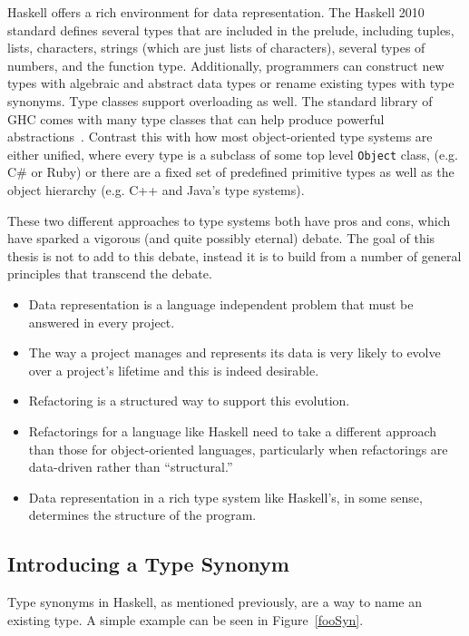 Haskell offers a rich environment for data representation. The Haskell 2010 standard defines several types that are included in the prelude, including tuples, lists, characters, strings (which are just lists of characters), several types of numbers, and the function type. Additionally, programmers can construct new types with algebraic and abstract data types or rename existing types with type synonyms. Type classes support overloading as well. The standard library of GHC comes with many type classes that can help produce powerful abstractions~\citep{typeclassopedia}. Contrast this with how most object-oriented type systems are either unified, where every type is a subclass of some top level \texttt{Object} class, (e.g. C\# or Ruby) or there are a fixed set of predefined primitive types as well as the object hierarchy (e.g. C++ and Java's type systems). 

These two different approaches to type systems both have pros and cons, which have sparked a vigorous (and quite possibly eternal) debate. The goal of this thesis is not to add to this debate, instead it is to build from a number of general principles that transcend the debate.

\begin{itemize}
	\item Data representation is a language independent problem that must be answered in every project.
	\item The way a project manages and represents its data is very likely to evolve over a project's lifetime and this is indeed desirable.
	\item Refactoring is a structured way to support this evolution.
		\item Refactorings for a language like Haskell need to take a different approach than those for object-oriented languages, particularly when refactorings are data-driven rather than ``structural.''  
	\item Data representation in a rich type system like Haskell's, in some sense, determines the structure of the program.
\end{itemize} 

\subsection{Introducing a Type Synonym}\label{introSyn}

Type synonyms in Haskell, as mentioned previously, are a way to name an existing type. A simple example can be seen in Figure~\ref{fooSyn}. 

